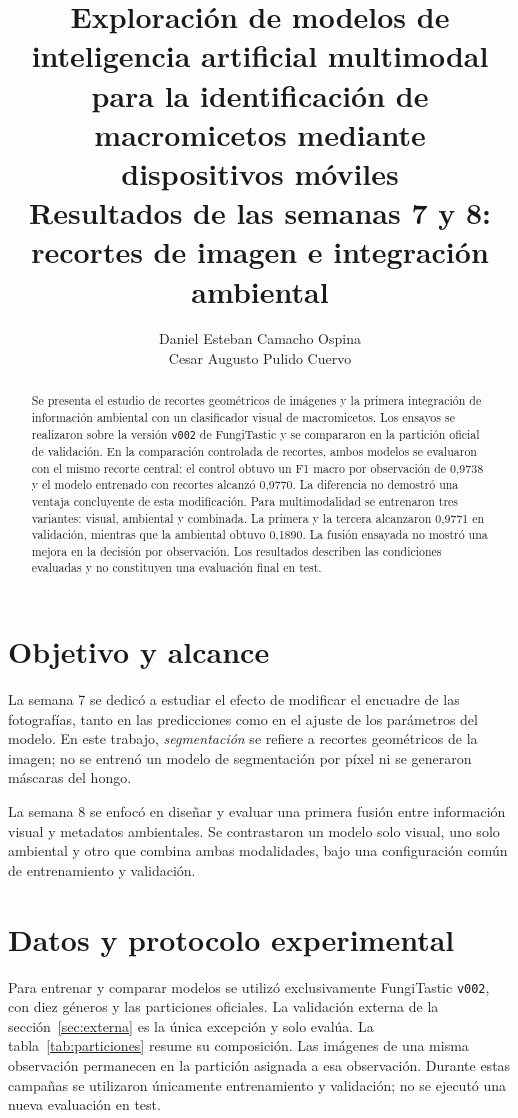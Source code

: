 \documentclass[11pt,a4paper]{article}
\title{\textbf{Exploración de modelos de inteligencia artificial multimodal\\
para la identificación de macromicetos mediante dispositivos móviles}\\[0.6em]
\normalsize Resultados de las semanas 7 y 8: recortes de imagen e integración ambiental}
\author{Daniel Esteban Camacho Ospina\\Cesar Augusto Pulido Cuervo}
\date{}
\begin{document}
\maketitle

\begin{abstract}
Se presenta el estudio de recortes geométricos de imágenes y la primera
integración de información ambiental con un clasificador visual de
macromicetos. Los ensayos se realizaron sobre la versión \texttt{v002} de
FungiTastic y se compararon en la partición oficial de validación. En la
comparación controlada de recortes, ambos modelos se evaluaron con el mismo
recorte central: el control obtuvo un F1 macro por observación de 0,9738 y el
modelo entrenado con recortes alcanzó 0,9770. La diferencia no demostró una
ventaja concluyente de esta modificación. Para multimodalidad se
entrenaron tres variantes: visual, ambiental y combinada. La primera y la
tercera alcanzaron 0,9771 en validación, mientras que la ambiental obtuvo
0,1890. La fusión ensayada no mostró una mejora en la decisión por observación.
Los resultados describen las condiciones evaluadas y no constituyen una
evaluación final en test.
\end{abstract}

\section{Objetivo y alcance}
La semana 7 se dedicó a estudiar el efecto de modificar el encuadre de las
fotografías, tanto en las predicciones como en el ajuste de los parámetros del
modelo. En este trabajo, \emph{segmentación} se refiere a recortes geométricos
de la imagen; no se entrenó un modelo de segmentación por píxel ni se generaron
máscaras del hongo.

La semana 8 se enfocó en diseñar y evaluar una primera fusión entre información
visual y metadatos ambientales. Se contrastaron un modelo solo visual, uno
solo ambiental y otro que combina ambas modalidades, bajo una configuración
común de entrenamiento y validación.

\section{Datos y protocolo experimental}
Para entrenar y comparar modelos se utilizó exclusivamente FungiTastic
\texttt{v002}, con diez géneros y las particiones oficiales. La validación
externa de la sección~\ref{sec:externa} es la única excepción y solo evalúa. La tabla~\ref{tab:particiones} resume su composición.
Las imágenes de una misma observación permanecen en la partición asignada a
esa observación. Durante estas campañas se utilizaron únicamente entrenamiento
y validación; no se ejecutó una nueva evaluación en test.
\end{document}
